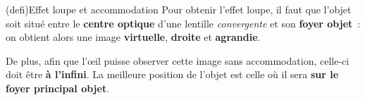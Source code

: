 \documentclass[../../main/main.tex]{subfiles}
\begin{document}
\begin{tcb*}[label=def:loupe, valign=center, sidebyside, sidebyside align=top](defi){Effet loupe et accommodation}
	Pour obtenir l'effet loupe, il faut que l'objet soit situé entre le
	\textbf{centre optique} d'une lentille \textit{convergente} et son
	\textbf{foyer objet}~: on obtient alors une image \textbf{virtuelle},
	\textbf{droite} et \textbf{agrandie}.
	\vfill
	\begin{center}
		\label{loupeavecacc}
	\end{center}
	\tcblower
	De plus, afin que l'œil puisse observer cette image sans accommodation,
	celle-ci doit être \textbf{à l'infini}. La meilleure position de l'objet
	est celle où il sera \textbf{sur le foyer principal objet}.
	\vspace{22pt}
	\begin{center}
\end{center}
\end{tcb*}
\end{document}
